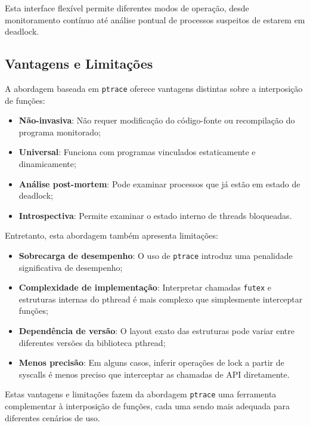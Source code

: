 Esta interface flexível permite diferentes modos de operação, desde monitoramento contínuo até análise pontual de processos suspeitos de estarem em deadlock.

\subsection{Vantagens e Limitações}

A abordagem baseada em \texttt{ptrace} oferece vantagens distintas sobre a interposição de funções:

\begin{itemize}
    \item \textbf{Não-invasiva}: Não requer modificação do código-fonte ou recompilação do programa monitorado;
    \item \textbf{Universal}: Funciona com programas vinculados estaticamente e dinamicamente;
    \item \textbf{Análise post-mortem}: Pode examinar processos que já estão em estado de deadlock;
    \item \textbf{Introspectiva}: Permite examinar o estado interno de threads bloqueadas.
\end{itemize}

Entretanto, esta abordagem também apresenta limitações:

\begin{itemize}
    \item \textbf{Sobrecarga de desempenho}: O uso de \texttt{ptrace} introduz uma penalidade significativa de desempenho;
    \item \textbf{Complexidade de implementação}: Interpretar chamadas \texttt{futex} e estruturas internas do pthread é mais complexo que simplesmente interceptar funções;
    \item \textbf{Dependência de versão}: O layout exato das estruturas pode variar entre diferentes versões da biblioteca pthread;
    \item \textbf{Menos precisão}: Em alguns casos, inferir operações de lock a partir de syscalls é menos preciso que interceptar as chamadas de API diretamente.
\end{itemize}

Estas vantagens e limitações fazem da abordagem \texttt{ptrace} uma ferramenta complementar à interposição de funções, cada uma sendo mais adequada para diferentes cenários de uso.
